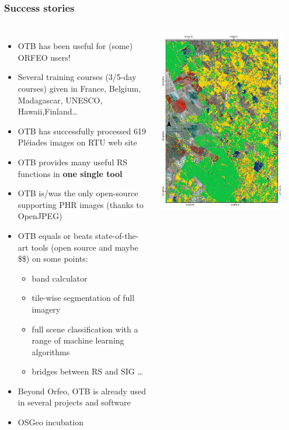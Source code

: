 \documentclass[8pt]{beamer}
\begin{document}
\begin{frame}
\frametitle{Success stories}
\begin{columns}
\begin{itemize}
\item OTB has been useful for (some) ORFEO users!
\item Several training courses (3/5-day courses) given in France, Belgium,
Madagascar, UNESCO, Hawaii,Finland\ldots
\item OTB has successfully processed 619 Pléiades
  images on RTU web site
\item OTB provides many useful RS functions in \textbf{one single tool}
\item OTB is/was the only open-source supporting PHR images (thanks to OpenJPEG)
\item OTB equals or beats state-of-the-art tools (open source and maybe \$\$) on some points: 
  \begin{itemize}
  \item band calculator
  \item tile-wise segmentation of full imagery
  \item full scene classification with a range of machine learning algorithms
  \item bridges between RS and SIG \ldots
  \end{itemize}
\item Beyond Orfeo, OTB is already used in several projects and software
\item OSGeo incubation
\end{itemize}
\includegraphics[width=0.9\textwidth]{images/resultats_ird.png}\\

\end{columns}
\end{frame}
\end{document}
